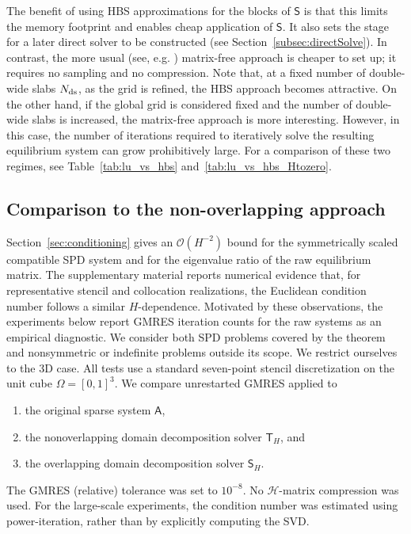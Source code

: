 \documentclass[final,onefignum,onetabnum]{siamart250211}
\newcommand{\mtx}[1]{\bm{\mathsf{#1}}}
\theoremstyle{definition}
\begin{document}
The benefit of using HBS approximations for the blocks of $\mtx{S}$ is that this limits the memory footprint and enables cheap application of $\mtx{S}$. It also sets the stage for a later direct solver to be constructed (see Section~\ref{subsec:directSolve}). In contrast, the more usual (see, e.g. \cite{smithDD,toselliWidlundDD}) matrix-free approach is cheaper to set up; it requires no sampling and no compression. Note that, at a fixed number of double-wide slabs $N_{\rm ds}$, as the grid is refined, the HBS approach becomes attractive. On the other hand, if the global grid is considered fixed and the number of double-wide slabs is increased, the matrix-free approach is more interesting. However, in this case, the number of iterations required to iteratively solve the resulting equilibrium system can grow prohibitively large. For a comparison of these two regimes, see Table~\ref{tab:lu_vs_hbs} and~\ref{tab:lu_vs_hbs_Htozero}.

\subsection{Comparison to the non-overlapping approach}
\label{subsec:gmres_iters}
Section~\ref{sec:conditioning} gives an $\mathcal{O}(H^{-2})$ bound for the symmetrically scaled compatible SPD system and for the eigenvalue ratio of the raw equilibrium matrix. The supplementary material reports numerical evidence that, for representative stencil and collocation realizations, the Euclidean condition number follows a similar $H$-dependence. Motivated by these observations, the experiments below report GMRES iteration counts for the raw systems as an empirical diagnostic. We consider both SPD problems covered by the theorem and nonsymmetric or indefinite problems outside its scope. We restrict ourselves to the 3D case. All tests use a standard seven-point stencil discretization on the unit cube $\Omega=[0,1]^3$. We compare unrestarted GMRES applied to
\begin{enumerate}
    \item the original sparse system $\mtx{A}$,
    \item the nonoverlapping domain decomposition solver $\mtx{T}_H$, and
    \item the overlapping domain decomposition solver $\mtx{S}_H$.
\end{enumerate} The GMRES (relative) tolerance was set to $10^{-8}$. No $\mathcal{H}$-matrix compression was used. For the large-scale experiments, the condition number was estimated using power-iteration, rather than by explicitly computing the SVD.
\end{document}
